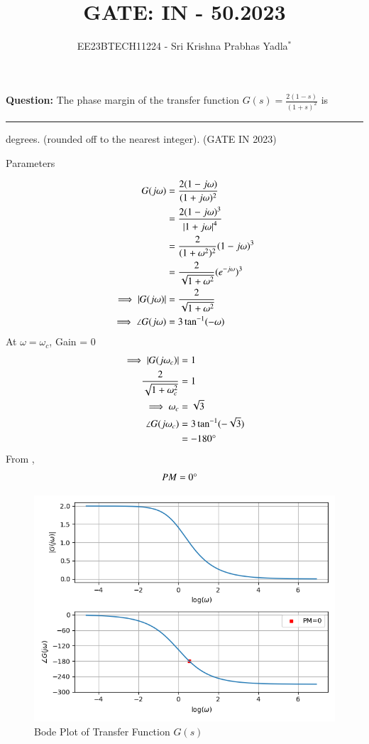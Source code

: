 \documentclass[journal,12pt,twocolumn]{IEEEtran}
\theoremstyle{remark}
\begin{document}

\vspace{3cm}

\title{GATE: IN - 50.2023}
\author{EE23BTECH11224 - Sri Krishna Prabhas Yadla$^{*}$%
}
\maketitle
\newpage
\bigskip

\renewcommand{\thefigure}{\arabic{figure}}
\renewcommand{\thetable}{\arabic{table}}


\vspace{3cm}
\textbf{Question:} The phase margin of the transfer function $G(s) = \frac{2(1-s)}{(1+s)^2}$ is \rule{1cm}{0.15mm} degrees. (rounded off to the nearest integer). \hfill (GATE IN 2023)\\
\solution
\begin{table}[htbp]
	\centering
	\def\arraystrech{1.5}
	
	\caption{Parameters}
	\label{tab:parameters}
\end{table}
\begin{align}
	G(j\omega) &= \frac{2(1-j\omega)}{(1+j\omega)^2} \\
	&= \frac{2(1-j\omega)^3}{\left\vert1+j\omega\right\vert^4}\\
	&= \frac{2}{(1+\omega^2)^2}(1-j\omega)^3 \\
	&= \frac{2}{\sqrt{1+\omega^2}}(e^{-j\omega})^3 \\
	\implies \left\vert G(j\omega)\right\vert &= \frac{2}{\sqrt{1+\omega^2}} \\
	\implies \angle G(j\omega) &= 3\tan^{-1}(-\omega)
\end{align}
At $\omega = \omega_c$, Gain = 0
\begin{align}
	\implies \left\vert G(j\omega_c)\right\vert &= 1 \\
	\frac{2}{\sqrt{1+\omega_c^2}} &= 1 \\
	\implies \omega_c &= \sqrt{3} \\
	\angle G(j\omega_c) &= 3\tan^{-1}(-\sqrt{3}) \\
	&= -180\degree
\end{align}
From ,
\begin{align}
	PM &= 0\degree
\end{align}
\begin{figure}[htbp]
	\includegraphics[width=\columnwidth]{figs/bode.png}
	\caption{Bode Plot of Transfer Function $G(s)$}
	\label{fig:bode}
\end{figure}
\end{document}
